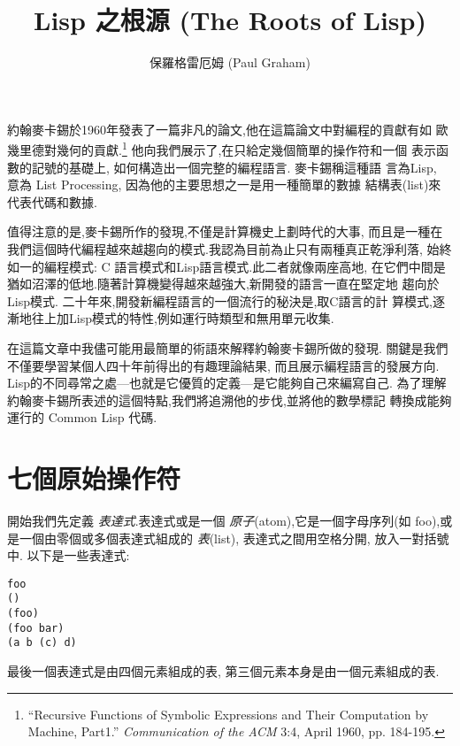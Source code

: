 \documentclass[12pt,a4]{article}
\begin{document}
 
\begin{CJK}{UTF8}{bsmi} %
\title{Lisp 之根源 (The Roots of Lisp)} 
\author{保羅格雷厄姆 (Paul Graham)} 
\maketitle 
\newcommand{\pone}{$p_{1}$} 
\newcommand{\pn}{$p_{n}$} 
\newcommand{\aone}{$a_{1}$} 
\newcommand{\an}{$a_{n}$} 
\newcommand{\vone}{$v_{1}$} 
\newcommand{\vn}{$v_{n}$} 
\newcommand{\eone}{$e_{1}$} 
\newcommand{\en}{$e_{n}$} 
約翰麥卡錫於1960年發表了一篇非凡的論文,他在這篇論文中對編程的貢獻有如 
歐幾里德對幾何的貢獻.\footnote{``Recursive Functions of Symbolic Expressions and Their Computation by Machine, Part1.'' 
{\it Communication of the ACM} 3:4, April 1960, pp.  184-195.} 
他向我們展示了,在只給定幾個簡單的操作符和一個 
表示函數的記號的基礎上, 
如何構造出一個完整的編程語言. 
麥卡錫稱這種語 
言為Lisp, 
意為 
List 
Processing, 
因為他的主要思想之一是用一種簡單的數據 
結構表(list)來代表代碼和數據. 

值得注意的是,麥卡錫所作的發現,不僅是計算機史上劃時代的大事, 
而且是一種在我們這個時代編程越來越趨向的模式.我認為目前為止只有兩種真正乾淨利落, 
始終如一的編程模式: C 語言模式和Lisp語言模式.此二者就像兩座高地, 
在它們中間是猶如沼澤的低地.隨著計算機變得越來越強大,新開發的語言一直在堅定地 
趨向於Lisp模式. 
二十年來,開發新編程語言的一個流行的秘決是,取C語言的計 
算模式,逐漸地往上加Lisp模式的特性,例如運行時類型和無用單元收集. 

在這篇文章中我儘可能用最簡單的術語來解釋約翰麥卡錫所做的發現. 
關鍵是我們不僅要學習某個人四十年前得出的有趣理論結果, 
而且展示編程語言的發展方向. 
Lisp的不同尋常之處---也就是它優質的定義---是它能夠自己來編寫自己. 
為了理解約翰麥卡錫所表述的這個特點,我們將追溯他的步伐,並將他的數學標記 
轉換成能夠運行的 Common Lisp 代碼. 

\section{七個原始操作符} 
開始我們先定義{\em 
表達式}.表達式或是一個{\em 
原子}(atom),它是一個字母序列(如 
foo),或是一個由零個或多個表達式組成的{\em 
表}(list), 
表達式之間用空格分開, 
放入一對括號中. 
以下是一些表達式: 
\begin{verbatim} 
foo 
() 
(foo) 
(foo bar) 
(a b (c) d) 
\end{verbatim} 
最後一個表達式是由四個元素組成的表, 
第三個元素本身是由一個元素組成的表. 


\end{CJK}
\end{document}
